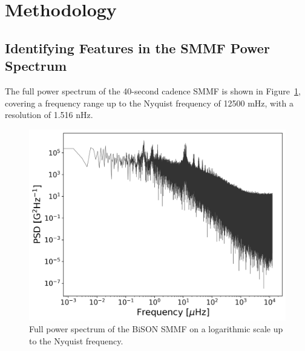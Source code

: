 



\section{Methodology}\label{sec:SMMF_method}


\subsection{Identifying Features in the SMMF Power Spectrum}

The full power spectrum of the 40-second cadence SMMF is shown in Figure~\ref{fig:BiSON_FT_full}, covering a frequency range up to the Nyquist frequency of 12500 mHz, with a resolution of 1.516 nHz. 

\begin{figure}[ht!]
	\centering
	\includegraphics[width=\columnwidth]{BiSON_SMMF_FT_full.png}
	\caption{Full power spectrum of the BiSON SMMF on a logarithmic scale up to the Nyquist frequency.}
	\label{fig:BiSON_FT_full}
\end{figure}

